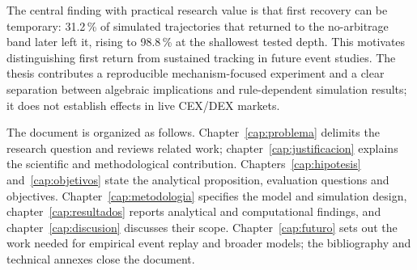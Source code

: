 The central finding with practical research value is that first recovery can be temporary: 31.2\,\% of simulated trajectories that returned to the no-arbitrage band later left it, rising to 98.8\,\% at the shallowest tested depth. This motivates distinguishing first return from sustained tracking in future event studies. The thesis contributes a reproducible mechanism-focused experiment and a clear separation between algebraic implications and rule-dependent simulation results; it does not establish effects in live CEX/DEX markets.

The document is organized as follows. Chapter~\ref{cap:problema} delimits the research question and reviews related work; chapter~\ref{cap:justificacion} explains the scientific and methodological contribution. Chapters~\ref{cap:hipotesis} and~\ref{cap:objetivos} state the analytical proposition, evaluation questions and objectives. Chapter~\ref{cap:metodologia} specifies the model and simulation design, chapter~\ref{cap:resultados} reports analytical and computational findings, and chapter~\ref{cap:discusion} discusses their scope. Chapter~\ref{cap:futuro} sets out the work needed for empirical event replay and broader models; the bibliography and technical annexes close the document.
